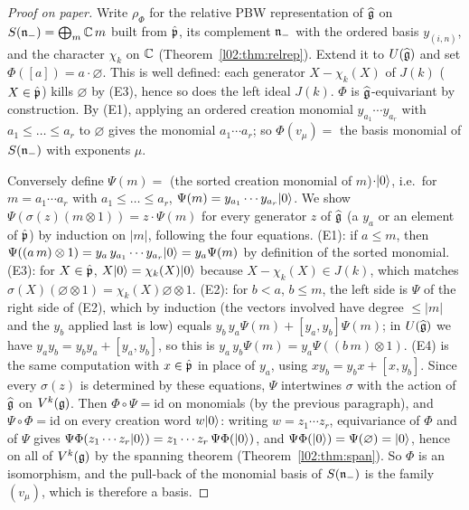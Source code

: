 \begin{proof}[Proof on paper]
Write $\rho_\Phi$ for the relative PBW representation of $\widehat{\mathfrak{g}}$ on $S(\mathfrak{n}_-) = \bigoplus_m{\mathbb{C}}\,m$ built from
$\hat{\mathfrak{p}}$, its complement $\mathfrak{n}_-$ with the ordered basis $y_{(i,n)}$, and the character $\chi_k$ on ${\mathbb{C}}$
(Theorem~\ref{l02:thm:relrep}). Extend it to $U(\widehat{\mathfrak{g}})$ and set $\Phi([a]) = a\cdot\varnothing$. This is
well defined: each generator $X - \chi_k(X)$ of $J(k)$ ($X\in\hat{\mathfrak{p}}$) kills $\varnothing$ by (E3), hence so
does the left ideal $J(k)$. $\Phi$ is $\widehat{\mathfrak{g}}$-equivariant by construction. By (E1), applying an ordered
creation monomial $y_{a_1}\cdots y_{a_r}$ with $a_1\le\dots\le a_r$ to $\varnothing$ gives the monomial
$a_1\cdots a_r$; so $\Phi(v_\mu) = $ the basis monomial of $S(\mathfrak{n}_-)$ with exponents $\mu$.

Conversely define $\Psi(m) = $ (the sorted creation monomial of $m$)$\cdot|0\rangle$, i.e.\ for
$m = a_1\cdots a_r$ with $a_1\le\dots\le a_r$, $\Psi(m) = y_{a_1}\cdots y_{a_r}|0\rangle$. We show
$\Psi(\sigma(z)(m\otimes1)) = z\cdot\Psi(m)$ for every generator $z$ of $\widehat{\mathfrak{g}}$ (a $y_a$ or an element of
$\hat{\mathfrak{p}}$) by induction on $|m|$, following the four equations. (E1): if $a\le m$, then
$\Psi((a\,m)\otimes1) = y_a\,y_{a_1}\cdots y_{a_r}|0\rangle = y_a\Psi(m)$ by definition of the sorted monomial. (E3): for
$X\in\hat{\mathfrak{p}}$, $X|0\rangle = \chi_k(X)|0\rangle$ because $X - \chi_k(X)\in J(k)$, which matches
$\sigma(X)(\varnothing\otimes1) = \chi_k(X)\varnothing\otimes1$. (E2): for $b<a$, $b\le m$, the left side is
$\Psi$ of the right side of (E2), which by induction (the vectors involved have degree $\le|m|$ and
the $y_b$ applied last is low) equals $y_b\,y_a\Psi(m) + [y_a,y_b]\Psi(m)$; in $U(\widehat{\mathfrak{g}})$ we have
$y_ay_b = y_by_a + [y_a,y_b]$, so this is $y_a\,y_b\Psi(m) = y_a\Psi((b\,m)\otimes1)$. (E4) is the same computation with
$x\in\hat{\mathfrak{p}}$ in place of $y_a$, using $xy_b = y_bx + [x,y_b]$. Since every $\sigma(z)$ is determined by these
equations, $\Psi$ intertwines $\sigma$ with the action of $\widehat{\mathfrak{g}}$ on $V^k(\mathfrak{g})$. Then
$\Phi\circ\Psi = \mathrm{id}$ on monomials (by the previous paragraph), and $\Psi\circ\Phi = \mathrm{id}$ on every
creation word $w|0\rangle$: writing $w = z_1\cdots z_r$, equivariance of $\Phi$ and of $\Psi$ gives
$\Psi\Phi(z_1\cdots z_r|0\rangle) = z_1\cdots z_r\,\Psi\Phi(|0\rangle)$, and $\Psi\Phi(|0\rangle) = \Psi(\varnothing) = |0\rangle$, hence on all of $V^k(\mathfrak{g})$ by the spanning theorem
 (Theorem~\ref{l02:thm:span}). So $\Phi$ is an isomorphism, and the pull-back of the
monomial basis of $S(\mathfrak{n}_-)$ is the family $(v_\mu)$, which is therefore a basis.
\end{proof}


